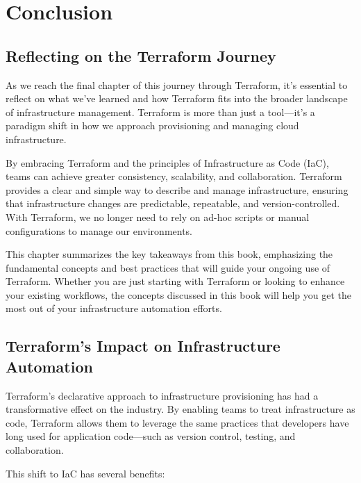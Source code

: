 \chapter{Conclusion}
\sloppy

\section{Reflecting on the Terraform Journey}

As we reach the final chapter of this journey through Terraform, it's essential to reflect on what we've learned and how Terraform fits into the broader landscape of infrastructure management. Terraform is more than just a tool—it's a paradigm shift in how we approach provisioning and managing cloud infrastructure.

By embracing Terraform and the principles of Infrastructure as Code (IaC), teams can achieve greater consistency, scalability, and collaboration. Terraform provides a clear and simple way to describe and manage infrastructure, ensuring that infrastructure changes are predictable, repeatable, and version-controlled. With Terraform, we no longer need to rely on ad-hoc scripts or manual configurations to manage our environments.

This chapter summarizes the key takeaways from this book, emphasizing the fundamental concepts and best practices that will guide your ongoing use of Terraform. Whether you are just starting with Terraform or looking to enhance your existing workflows, the concepts discussed in this book will help you get the most out of your infrastructure automation efforts.

\section{Terraform's Impact on Infrastructure Automation}

Terraform's declarative approach to infrastructure provisioning has had a transformative effect on the industry. By enabling teams to treat infrastructure as code, Terraform allows them to leverage the same practices that developers have long used for application code—such as version control, testing, and collaboration.

This shift to IaC has several benefits:

